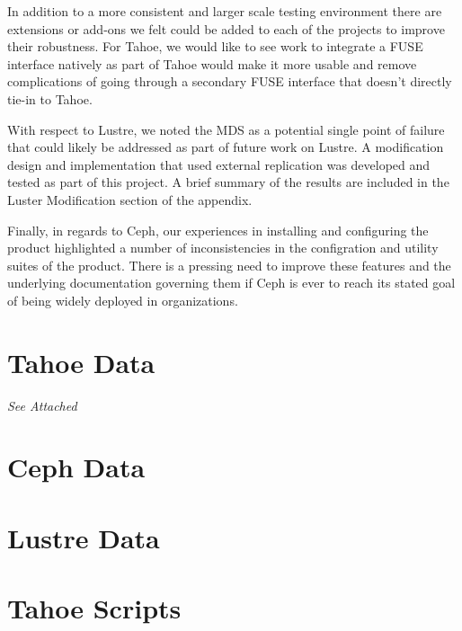 \documentclass[11pt]{article}
\begin{document}
In addition to a more consistent and larger scale testing environment there 
are extensions or add-ons we felt could be added to each of the projects to
improve their robustness. For Tahoe, we would like to see work to integrate 
a FUSE interface natively as part of Tahoe would make it more usable and 
remove complications of going through a secondary FUSE interface that doesn't 
directly tie-in to Tahoe. 

With respect to Lustre, we noted the MDS as a potential single point of 
failure that could likely be addressed as part of future work on Lustre. A 
modification design and implementation that used external replication was 
developed and tested as part of this project. A brief summary of the results 
are included in the Luster Modification section of the appendix.

Finally, in regards to Ceph, our experiences in installing and configuring 
the product highlighted a number of inconsistencies in the configration and 
utility suites of the product. There is a pressing need to improve these 
features and the underlying documentation governing them if Ceph is ever to 
reach its stated goal of being widely deployed in organizations. 

\nocite{*}


\appendix

\pagebreak
\section{Tahoe Data}
\label{sec:TahoeData}

\emph{See Attached}




\pagebreak
\section{Ceph Data}
\label{sec:CephData}

\pagebreak
\section{Lustre Data}
\label{sec:LustreData}

\pagebreak
\section{Tahoe Scripts}
\label{sec:TahoeScripts}
\end{document}
